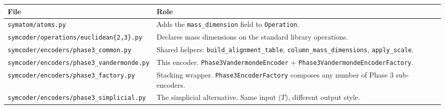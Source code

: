\documentclass[a4paper,11pt]{article}
\begin{document}
\begin{tabular}{lp{9cm}}
\toprule
File & Role \\
\midrule
\texttt{symatom/atoms.py} &
  Adds the \texttt{mass\_dimension} field to \texttt{Operation}.
\\
\texttt{symcoder/operations/euclidean\{2,3\}.py} &
  Declares mass dimensions on the standard library operations.
\\
\texttt{symcoder/encoders/phase3\_common.py} &
  Shared helpers: \texttt{build\_alignment\_table},
  \texttt{column\_mass\_dimensions}, \texttt{apply\_scale}.
\\
\texttt{symcoder/encoders/phase3\_vandermonde.py} &
  This encoder.  \texttt{Phase3VandermondeEncoder} +
  \texttt{Phase3VandermondeEncoderFactory}.
\\
\texttt{symcoder/encoders/phase3\_factory.py} &
  Stacking wrapper.  \texttt{Phase3EncoderFactory} composes any
  number of Phase 3 sub-encoders.
\\
\texttt{symcoder/encoders/phase3\_simplicial.py} &
  The simplicial alternative.  Same input ($T$), different output style.
\\
\bottomrule
\end{tabular}
\end{document}
